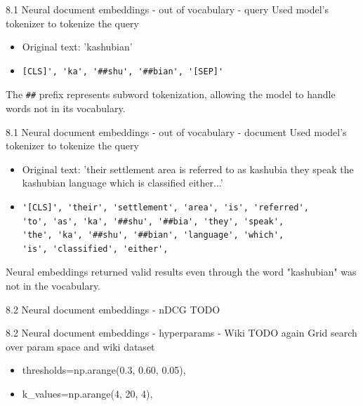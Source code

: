 \documentclass{beamer}
\begin{document}
\begin{frame}[fragile]{8.1 Neural document embeddings - out of vocabulary - query}
  Used model's tokenizer to tokenize the query
  \begin{itemize}
    \item Original text: 'kashubian'
    \item \begin{verbatim}[CLS]', 'ka', '##shu', '##bian', '[SEP]'\end{verbatim}
  \end{itemize}
  The \verb|##| prefix represents subword tokenization, allowing the model to handle words not in its vocabulary.
\end{frame}
\begin{frame}[fragile]{8.1 Neural document embeddings - out of vocabulary - document}
  Used model's tokenizer to tokenize the query
  \begin{itemize}
    \item Original text: 'their settlement area is referred to as kashubia they speak the kashubian language which is classified either...'
    \item \begin{verbatim}
'[CLS]', 'their', 'settlement', 'area', 'is', 'referred',
'to', 'as', 'ka', '##shu', '##bia', 'they', 'speak',
'the', 'ka', '##shu', '##bian', 'language', 'which',
'is', 'classified', 'either',\end{verbatim}
  \end{itemize}
  Neural embeddings returned valid results even through the word "kashubian" was not in the vocabulary.
\end{frame}


\begin{frame}{8.2 Neural document embeddings - nDCG}
  TODO
\end{frame}


\begin{frame}{8.2 Neural document embeddings - hyperparams - Wiki}
  TODO again
  Grid search over param space and wiki dataset
  \begin{itemize}
    \item thresholds=np.arange(0.3, 0.60, 0.05),
    \item k\_values=np.arange(4, 20, 4),
  \end{itemize}
\end{frame}
\end{document}
